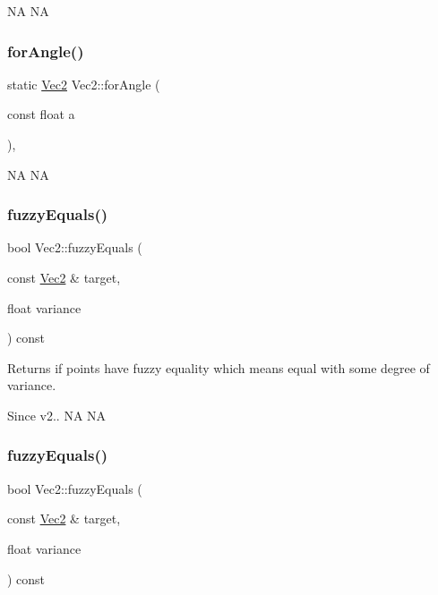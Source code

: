 NA  NA \mbox{\label{classVec2_aba30a4b093635bdd1fa4e329e93455d9}} 
\subsubsection{\texorpdfstring{for\+Angle()}{forAngle()}\hspace{0.1cm}{\footnotesize\ttfamily [2/2]}}
{\footnotesize\ttfamily static \hyperlink{classVec2}{Vec2} Vec2\+::for\+Angle (\begin{DoxyParamCaption}\item[{const float}]{a }\end{DoxyParamCaption})\hspace{0.3cm}{\ttfamily [inline]}, {\ttfamily [static]}}

NA  NA \mbox{\label{classVec2_a5ac04604789866d317ade8f4579b37a9}} 
\subsubsection{\texorpdfstring{fuzzy\+Equals()}{fuzzyEquals()}\hspace{0.1cm}{\footnotesize\ttfamily [1/2]}}
{\footnotesize\ttfamily bool Vec2\+::fuzzy\+Equals (\begin{DoxyParamCaption}\item[{const \hyperlink{classVec2}{Vec2} \&}]{target,  }\item[{float}]{variance }\end{DoxyParamCaption}) const}

\begin{DoxyReturn}{Returns}
if points have fuzzy equality which means equal with some degree of variance. 
\end{DoxyReturn}
\begin{DoxySince}{Since}
v2..  NA  NA 
\end{DoxySince}
\mbox{\label{classVec2_a5ac04604789866d317ade8f4579b37a9}} 
\subsubsection{\texorpdfstring{fuzzy\+Equals()}{fuzzyEquals()}\hspace{0.1cm}{\footnotesize\ttfamily [2/2]}}
{\footnotesize\ttfamily bool Vec2\+::fuzzy\+Equals (\begin{DoxyParamCaption}\item[{const \hyperlink{classVec2}{Vec2} \&}]{target,  }\item[{float}]{variance }\end{DoxyParamCaption}) const}


